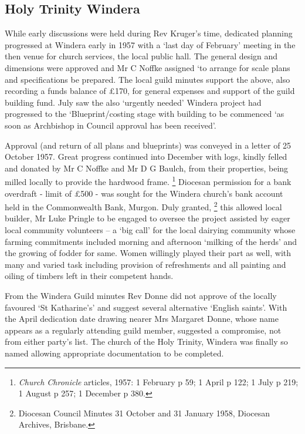 \subsection{Holy Trinity Windera}



While early discussions were held during Rev Kruger's time, dedicated planning progressed at Windera early in 1957 with a `last day of February' meeting in the then venue for church services, the local public hall. The general design and dimensions were approved and Mr C Noffke assigned `to arrange for scale plans and specifications be prepared. The local guild minutes support the above, also recording a funds balance of \pounds170, for general expenses and support of the guild building fund. July saw the also `urgently needed' Windera project had progressed to the `Blueprint/costing stage with building to be commenced `as soon as Archbishop in Council approval has been received'.



Approval (and return of all plans and blueprints) was conveyed in a letter of 25 October 1957. Great progress continued into December with logs, kindly felled and donated by Mr C Noffke and Mr D G Baulch, from their properties, being milled locally to provide the hardwood frame. \footnote{\emph{Church Chronicle} articles, 1957: 1 February p 59; 1 April p 122; 1 July p 219; 1 August p 257; 1 December p 380.} Diocesan permission for a bank overdraft - limit of \pounds500 - was sought for the Windera church's bank account held in the Commonwealth Bank, Murgon. Duly granted, \footnote{Diocesan Council Minutes 31 October and 31 January 1958, Diocesan Archives, Brisbane.} this allowed local builder, Mr Luke Pringle to be engaged to oversee the project assisted by eager local community volunteers -- a `big call' for the local dairying community whose farming commitments included morning and afternoon `milking of the herds' and the growing of fodder for same. Women willingly played their part as well, with many and varied task including provision of refreshments and all painting and oiling of timbers left in their competent hands.


From the Windera Guild minutes Rev Donne did not approve of the locally favoured `St Katharine's' and suggest several alternative `English saints'. With the April dedication date drawing nearer Mrs Margaret Donne, whose name appears as a regularly attending guild member, suggested a compromise, not from either party's list. The church of the Holy Trinity, Windera was finally so named allowing appropriate documentation to be completed.



